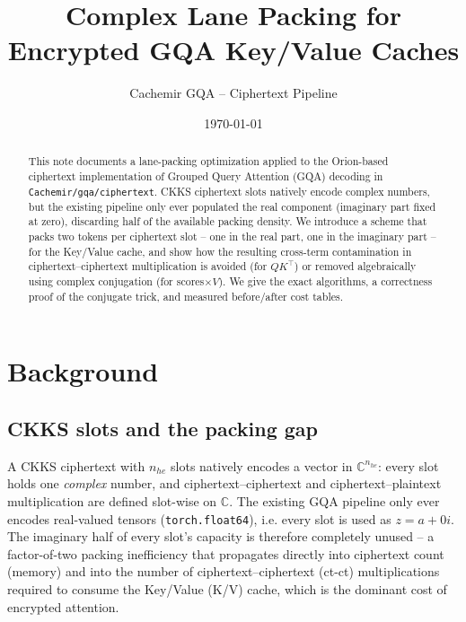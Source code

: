 \documentclass[11pt]{article}
\title{Complex Lane Packing for Encrypted GQA Key/Value Caches}
\author{Cachemir GQA -- Ciphertext Pipeline}
\date{\today}
\begin{document}
\maketitle

\begin{abstract}
This note documents a lane-packing optimization applied to the Orion-based
ciphertext implementation of Grouped Query Attention (GQA) decoding in
\texttt{Cachemir/gqa/ciphertext}. CKKS ciphertext slots natively encode
complex numbers, but the existing pipeline only ever populated the real
component (imaginary part fixed at zero), discarding half of the available
packing density. We introduce a scheme that packs two tokens per ciphertext
slot -- one in the real part, one in the imaginary part -- for the
Key/Value cache, and show how the resulting cross-term contamination in
ciphertext--ciphertext multiplication is avoided (for $QK^\top$) or removed
algebraically using complex conjugation (for scores$\times V$). We give the
exact algorithms, a correctness proof of the conjugate trick, and measured
before/after cost tables.
\end{abstract}

\tableofcontents

\section{Background}

\subsection{CKKS slots and the packing gap}
A CKKS ciphertext with $n_{he}$ slots natively encodes a vector in
$\mathbb{C}^{n_{he}}$: every slot holds one \emph{complex} number, and
ciphertext--ciphertext and ciphertext--plaintext multiplication are defined
slot-wise on $\mathbb{C}$. The existing GQA pipeline only ever encodes
real-valued tensors (\texttt{torch.float64}), i.e. every slot is used as
$z = a + 0i$. The imaginary half of every slot's capacity is therefore
completely unused -- a factor-of-two packing inefficiency that propagates
directly into ciphertext count (memory) and into the number of
ciphertext--ciphertext (ct-ct) multiplications required to consume the
Key/Value (K/V) cache, which is the dominant cost of encrypted attention.
\end{document}
